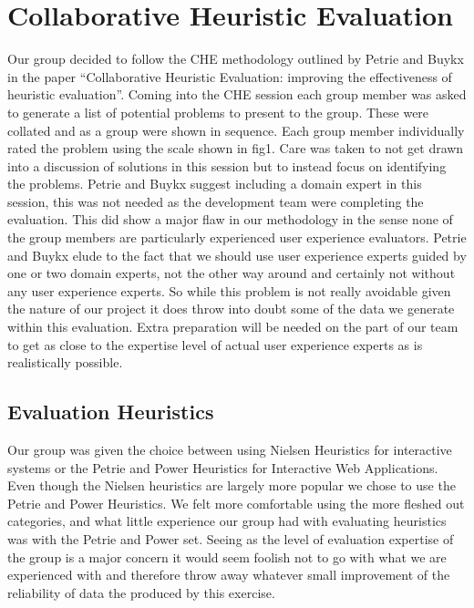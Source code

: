 \section{Collaborative Heuristic Evaluation}


Our group decided to follow the CHE methodology outlined by Petrie and Buykx in the paper “Collaborative Heuristic Evaluation: improving the effectiveness of heuristic evaluation”. Coming into the CHE session each group member was asked to generate a list of potential problems to present to the group. These were collated and as a group were shown in sequence. Each group member individually rated the problem using the scale shown in fig1. Care was taken to not get drawn into a discussion of solutions in this session but to instead focus on identifying the problems. Petrie and Buykx suggest including a domain expert in this session, this was not needed as the development team were completing the evaluation. This did show a major flaw in our methodology in the sense none of the group members are particularly experienced user experience evaluators. Petrie and Buykx elude to the fact that we should use user experience experts guided by one or two domain experts, not the other way around and certainly not without any user experience experts. So while this problem is not really avoidable given the nature of our project it does throw into doubt some of the data we generate within this evaluation. Extra preparation will be needed on the part of our team to get as close to the expertise level of actual user experience experts as is realistically possible.

\subsection{Evaluation Heuristics}
Our group was given the choice between using Nielsen Heuristics for interactive systems or the Petrie and Power Heuristics for Interactive Web Applications. Even though the Nielsen heuristics are largely more popular we chose to use the Petrie and Power Heuristics. We felt more comfortable using the more fleshed out categories, and what little experience our group had with evaluating heuristics was with the Petrie and Power set. Seeing as the level of evaluation expertise of the group is a major concern it would seem foolish not to go with what we are experienced with and therefore throw away whatever small improvement of the reliability of data the produced by this exercise.

